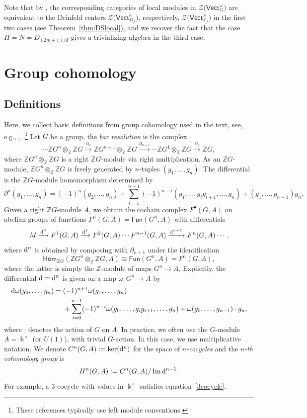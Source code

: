 \documentclass[pdftex]{sigma}
\numberwithin{equation}{section}
\newcommand{\ov}[1]{\overline{#1}}
\newcommand{\deri}{{\rm d}}
\newcommand{\Hom}{\mathsf{Hom}}
\newcommand{\Img}{\operatorname{Im}}
\newcommand{\Fun}{\mathsf{Fun}}
\newcommand{\Vect}{\mathsf{Vect}}
\newcommand{\mZ}{\mathbb{Z}}
\newcommand{\cZ}{\mathcal{Z}}
\begin{document}
 Note that by \cite{Sch}, the corresponding categories of local modules in $\cZ\big(\Vect_G^\omega\big)$ are equivalent to the Drinfeld centers $\cZ\big(\Vect_{D_f}^{\ov{\omega}}\big)$, respectively, $\cZ\big(\Vect_{\mZ_f}^{\ov{\omega}}\big)$ in the first two cases (see Theorem~\ref{thm:DSlocal}), and we recover the fact that the case $H=N=D_{(2m+1)/d}$ gives a trivializing algebra in the third case.

\appendix
\section{Group cohomology}\label{appendix}

\subsection{Definitions}%

Here, we collect basic definitions from group cohomology used in the text, see, e.g., \cite[Section~3.4]{Ben}, \cite[Chapter~III]{Bro}.\footnote{These references typically use left module conventions.} Let $G$ be a group, the \emph{bar resolution} is the complex
\[\cdots \mZ G^n \otimes_{\mZ} \mZ G\xrightarrow{\partial_n} \mZ G^{n-1}\otimes_{\mZ}\mZ G \xrightarrow{\partial_{n-1}} \cdots \mZ G^1\otimes_{\mZ}\mZ G \xrightarrow{\partial_1}\mZ G,\]
where $ \mZ G^n\otimes_{\mZ} \mZ G$ is a right $\mZ G$-module via right multiplication. As an $\mZ G$-module, $\mZ G^n\otimes_{\mZ} \mZ G $ is freely generated by $n$-tuples $(g_1,\dots, g_n)$. The differential is the $\mZ G$-module homomorphism determined by
\[\partial^n(g_1,\dots, g_n)=(-1)^n(g_2,\dots, g_n)+ \sum_{i=1}^{n-1}(-1)^{n-i} (g_1,\dots, g_ig_{i+1},\dots, g_n)+ (g_1, \dots, g_{n-1})g_n.\]
Given a right $\mZ G$-module $A$, we obtain the cochain complex $F^\bullet(G,A)$ on abelian groups of functions $F^n(G,A)=\Fun(G^n,A)$ with differentials
\[ M \xrightarrow{\deri^0} F^1( G,A) \xrightarrow{\deri^1} F^2(G,A) \cdots F^{n-1}(G,A)\xrightarrow{\deri^{n-1}}
F^n(G,A)\cdots, \]
where $\deri^n$ is obtained by composing with $\partial_{n+1}$ under the identification \[\Hom_{\mZ G}(\mZ G^n\otimes_{\mZ} \mZ G,A)\cong \Fun(G^n,A)=F^n(G,A),\]
where the latter is simply the $\mZ$-module of maps $G^n\to A$. Explicitly, the differential $\deri=\deri^n$ is given on a map $\omega\colon G^n\to A$ by
\begin{equation*}%
 \begin{split}\deri \omega(g_0,\dots, g_{n})={}& (-1)^{n+1}\omega(g_1,\dots, g_{n})\\
 &{}+\sum_{i=0}^{n-1}(-1)^{n-i}\omega(g_0,\dots, g_ig_{i+1}, \dots, g_{n})+ \omega(g_0,\dots, g_{n-1})\cdot g_{n},
 \end{split}
\end{equation*}
where $\cdot$ denotes the action of $G$ on $A$. In practice, we often use the $G$-module $A=\Bbbk^\times$ (or $U(1)$), with trivial $G$-action. In this case, we use multiplicative notation.
We denote $C^n(G,A):=\ker(\deri^n)$ for the space of \emph{$n$-cocycles} and the \emph{$n$-th cohomology group} is
\[H^n(G,A):=C^n(G,A)/\Img \deri^{n-1}.\]
For example, a $3$-cocycle with values in $\Bbbk^\times$ satisfies equation~\eqref{3cocycle}.
\end{document}

